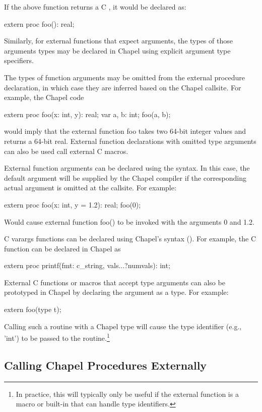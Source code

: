 If the above function returns a C , it would be declared as:
\begin{chapel}
       extern proc foo(): real;
\end{chapel}
Similarly, for external functions that expect arguments, the types of those
arguments types may be declared in Chapel using explicit argument type specifiers.

The types of function arguments may be omitted from the external procedure
declaration, in which case they are inferred based on the Chapel callsite.
For example, the Chapel code
\begin{chapel}
       extern proc foo(x: int, y): real;
       var a, b: int;
       foo(a, b);
\end{chapel}
\noindent
would imply that the external function foo takes two 64-bit integer values
and returns a 64-bit real.  External function declarations with omitted type
arguments can also be used call external C macros.

External function arguments can be declared using the 
syntax.  In this case, the default argument will be supplied by the Chapel
compiler if the corresponding actual argument is omitted at the callsite.  For example:
\begin{chapel}
       extern proc foo(x: int, y = 1.2): real;
       foo(0);
\end{chapel}
Would cause external function foo() to be invoked with the arguments 0
and 1.2.

C varargs functions can be declared using
Chapel's  syntax ().  For example,
the C  function can be declared in Chapel as
\begin{chapel}
       extern proc printf(fmt: c_string, vals...?numvals): int;
\end{chapel}

External C functions or macros that accept type arguments can also be
prototyped in Chapel by declaring the argument as a type.  For
example:
\begin{chapel}
       extern foo(type t);
\end{chapel}
Calling such a routine with a Chapel type will cause the type
identifier (e.g., 'int') to be passed to the routine.\footnote{In practice,
this will typically only be useful if the external function is a macro
or built-in that can handle type identifiers.}

\subsection{Calling Chapel Procedures Externally}
\label{Calling_Chapel_Procedures_Externally}

